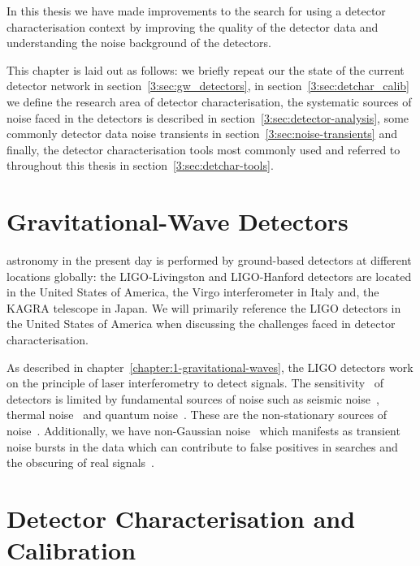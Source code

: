 
In this thesis we have made improvements to the search for \gws using a detector characterisation context by improving the quality of the detector data and understanding the noise background of the detectors. 

This chapter is laid out as follows: we briefly repeat our the state of the current \gwadj detector network in section~\ref{3:sec:gw_detectors}, in section~\ref{3:sec:detchar_calib} we define the research area of detector characterisation, the systematic sources of noise faced in the detectors is described in section~\ref{3:sec:detector-analysis}, some commonly detector data noise transients in section~\ref{3:sec:noise-transients} and finally, the detector characterisation tools most commonly used and referred to throughout this thesis in section~\ref{3:sec:detchar-tools}.

\section{\label{3:sec:gw_detectors}Gravitational-Wave Detectors}

\Gwadj astronomy in the present day is performed by ground-based detectors at different locations globally: the LIGO-Livingston and LIGO-Hanford detectors are located in the United States of America, the Virgo interferometer in Italy and, the KAGRA telescope in Japan. We will primarily reference the LIGO detectors in the United States of America when discussing the challenges faced in detector characterisation. 

As described in chapter~\ref{chapter:1-gravitational-waves}, the LIGO detectors work on the principle of laser interferometry to detect \gwadj signals. The sensitivity~\cite{aLIGO_design_curve:2018} of \gwadj detectors is limited by fundamental sources of noise such as seismic noise~\cite{Glanzer:2023}, thermal noise~\cite{thermal_noise:2018} and quantum noise~\cite{quantum_noise:2003}. These are the non-stationary sources of noise~\cite{PSD_var:2020}. Additionally, we have non-Gaussian noise~\cite{Noise_Guide:2020} which manifests as transient noise bursts in the data which can contribute to false positives in \gwadj searches and the obscuring of real \gwadj signals~\cite{GW170817:2017, GW150914_noise:2016}.

\section{\label{3:sec:detchar_calib}Detector Characterisation and Calibration}

